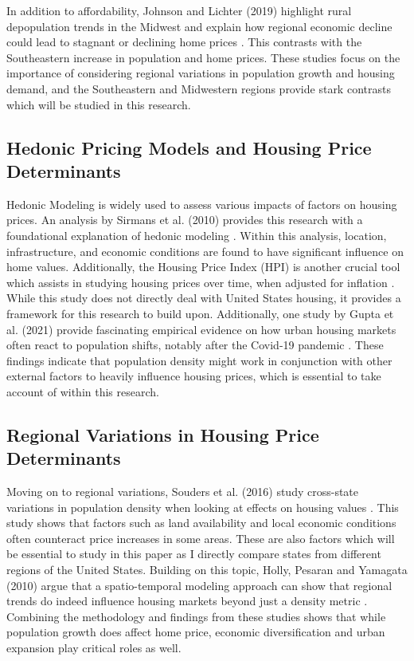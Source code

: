 \documentclass[journal,article,submit,pdftex,moreauthors]{Definitions/mdpi}
\begin{document}
In addition to affordability, Johnson and Lichter (2019) highlight rural depopulation trends in the Midwest and explain how regional economic decline could lead to stagnant or declining home prices \citep{johnson_2019_rural}. This contrasts with the Southeastern increase in population and home prices. These studies focus on the importance of considering regional variations in population growth and housing demand, and the Southeastern and Midwestern regions provide stark contrasts which will be studied in this research.

\subsection{Hedonic Pricing Models and Housing Price Determinants}

Hedonic Modeling is widely used to assess various impacts of factors on housing prices. An analysis by Sirmans et al. (2010) provides this research with a foundational explanation of hedonic modeling \citep{sirmans_2005_the}. Within this analysis, location, infrastructure, and economic conditions are found to have significant influence on home values. Additionally, the Housing Price Index (HPI) is another crucial tool which assists in studying housing prices over time, when adjusted for inflation \citep{suhaida_2011_housing}. While this study does not directly deal with United States housing, it provides a framework for this research to build upon. Additionally, one study by Gupta et al. (2021) provide fascinating empirical evidence on how urban housing markets often react to population shifts, notably after the Covid-19 pandemic \citep{gupta_2021_flattening}. These findings indicate that population density might work in conjunction with other external factors to heavily influence housing prices, which is essential to take account of within this research.

\subsection{Regional Variations in Housing Price Determinants}

Moving on to regional variations, Souders et al. (2016) study cross-state variations in population density when looking at effects on housing values \citep{souders_2016_the}. This study shows that factors such as land availability and local economic conditions often counteract price increases in some areas. These are also factors which will be essential to study in this paper as I directly compare states from different regions of the United States. Building on this topic, Holly, Pesaran and Yamagata (2010) argue that a spatio-temporal modeling approach can show that regional trends do indeed influence housing markets beyond just a density metric \citep{holly_2010_a}. Combining the methodology and findings from these studies shows that while population growth does affect home price, economic diversification and urban expansion play critical roles as well.  
\end{document}
